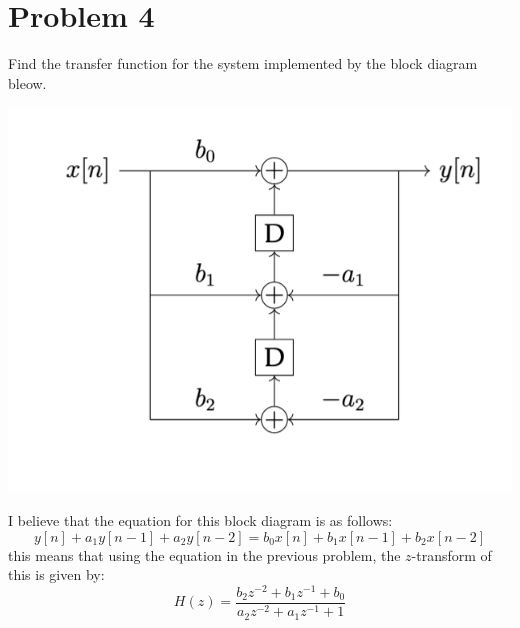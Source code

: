 \documentclass[10pt]{article}
\begin{document}
	\pagebreak
	\section*{Problem 4}
	Find the transfer function for the system implemented by the block diagram bleow. 
	\begin{center}
		\includegraphics[scale=0.8]{diagram.png}
	\end{center}

	\begin{solution}
		I believe that the equation for this block diagram is as follows:
		\[
			y[n] + a_1y[n-1] + a_2y[n-2] = b_0x[n] + b_1x[n-1] + b_2x[n- 2]
		\] 
		this means that using the equation in the previous problem, the \( z \)-transform of this is 
		given by:
		\[
		H(z) = \frac{b_2z^{-2} + b_1z^{-1} + b_0}{a_2z^{-2} + a_1z^{-1} + 1}
		\] 
	\end{solution}
	\pagebreak
\end{document}
